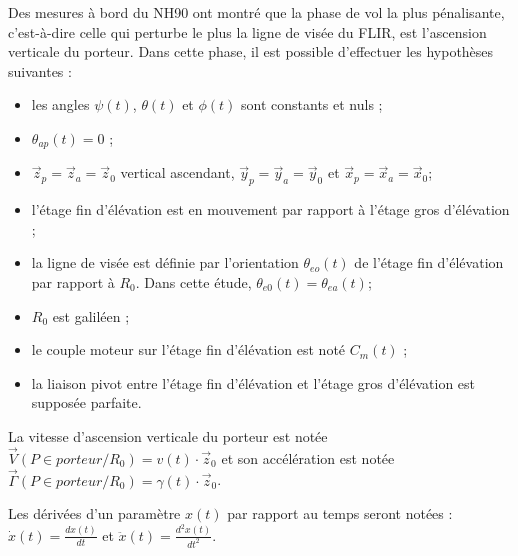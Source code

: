 Des mesures à bord du NH90 ont montré que la phase de vol la plus pénalisante, c'est-à-dire celle qui perturbe
le plus la ligne de visée du FLIR, est l'ascension verticale du porteur. Dans cette phase, il est possible d'effectuer
les hypothèses suivantes :
\begin{itemize}
\item les angles $\psi(t)$, $\theta(t)$ et $\phi(t)$ sont constants et nuls ;
\item $\theta_{ap}(t)=0$ ;
\item $\overrightarrow{z}_p=\overrightarrow{z}_a=\overrightarrow{z}_0$ vertical ascendant, $\overrightarrow{y}_p=\overrightarrow{y}_a=\overrightarrow{y}_0$ et $\overrightarrow{x}_p=\overrightarrow{x}_a=\overrightarrow{x}_0$;
\item l'étage fin d'élévation est en mouvement par rapport à l'étage gros d'élévation ;
\item la ligne de visée est définie par l'orientation $\theta_{eo}(t)$ de l'étage fin d'élévation par rapport à $R_0$. Dans cette
étude, $\theta_{e0}(t)=\theta_{ea}(t)$;
\item $R_0$ est galiléen ;
\item le couple moteur sur l'étage fin d'élévation est noté $C_m(t)$ ;
\item la liaison pivot entre l'étage fin d'élévation et l'étage gros d'élévation est supposée parfaite.
\end{itemize}

La vitesse d'ascension verticale du porteur est notée $\overrightarrow{V}(P\in porteur/R_0)=v(t)\cdot \overrightarrow{z}_0$ et son accélération est notée $\overrightarrow{\Gamma}(P\in porteur/R_0)=\gamma(t)\cdot \overrightarrow{z}_0$.

Les dérivées d'un paramètre $x(t)$ par rapport au temps seront notées : $\dot{x}(t)=\frac{dx(t)}{dt}$ et $\ddot{x}(t)=\frac{d^2x(t)}{dt^2}$. 









